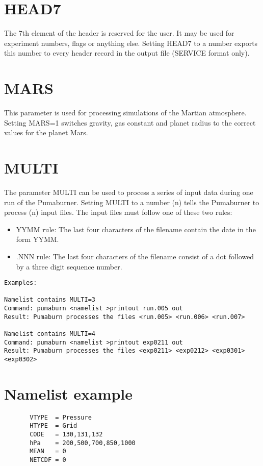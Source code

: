 \section{HEAD7}
The 7th element of the header is reserved for the user.
It may be used for experiment numbers, flags or anything else.
Setting HEAD7 to a number exports this number to every header record
in the output file (SERVICE format only).

\section{MARS}
This parameter is used for processing simulations of the Martian atmosphere.
Setting MARS=1 switches gravity, gas constant and planet radius
to the correct values for the planet Mars.

\section{MULTI}
The parameter MULTI can be used to process a series of input data during
 one run of the Pumaburner. Setting MULTI to a number (n)
tells the Pumaburner to process (n) input files.
The input files must follow one of these two rules:
\begin{itemize}
\item YYMM rule: The last four characters of the filename 
                 contain the date in the form YYMM.
\item .NNN rule: The last four characters of the filename
                 consist of a dot followed by a three digit sequence number.
\end{itemize}

\begin{verbatim}
Examples:

Namelist contains MULTI=3
Command: pumaburn <namelist >printout run.005 out
Result: Pumaburn processes the files <run.005> <run.006> <run.007>

Namelist contains MULTI=4
Command: pumaburn <namelist >printout exp0211 out
Result: Pumaburn processes the files <exp0211> <exp0212> <exp0301> <exp0302>
\end{verbatim}

\section{Namelist example}
\begin{verbatim}
       VTYPE  = Pressure
       HTYPE  = Grid
       CODE   = 130,131,132
       hPa    = 200,500,700,850,1000
       MEAN   = 0
       NETCDF = 0
\end{verbatim}

